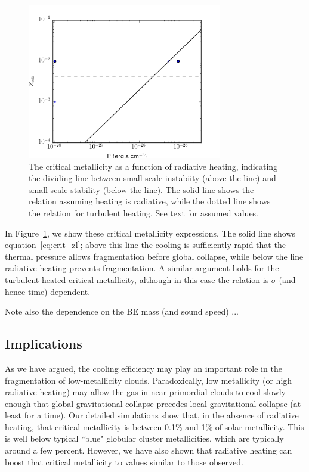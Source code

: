 \documentclass[useAMS,usenatbib]{mn2e}
\begin{document}
\begin{figure}
\begin{center}
\includegraphics[width=8.5cm]{heating_cooling/Zcrit.png}
\end{center}
\caption{\label{fig:zcrit} The critical metallicity as a function of radiative heating, indicating the dividing line between small-scale instabiity (above the line) and small-scale stability (below the line).  The solid line shows the relation assuming heating is radiative, while the dotted line shows the relation for turbulent heating.  See text for assumed values.  }
\end{figure}

In Figure~\ref{fig:zcrit}, we show these critical metallicity expressions.  The solid line shows equation~\ref{eq:crit_zl}; above this line the cooling is sufficiently rapid that the thermal pressure allows fragmentation before global collapse, while below the line radiative heating prevents fragmentation.  A similar argument holds for the turbulent-heated critical metallicity, although in this case the relation is $\sigma$ (and hence time) dependent.

Note also the dependence on the BE mass (and sound speed) ...

\subsection{Implications}

As we have argued, the cooling efficiency may play an important role in the fragmentation of low-metallicity clouds.  Paradoxically, low metallicity (or high radiative heating) may allow the gas in near primordial clouds to cool slowly enough that global gravitational collapse precedes local gravitational collapse (at least for a time).  Our detailed simulations show that, in the absence of radiative heating, that critical metallicity is between 0.1\% and 1\% of solar metallicity.  This is well below typical ``blue" globular cluster metallicities, which are typically around a few percent.  However, we have also shown that radiative heating can boost that critical metallicity to values similar to those observed.  
\end{document}
